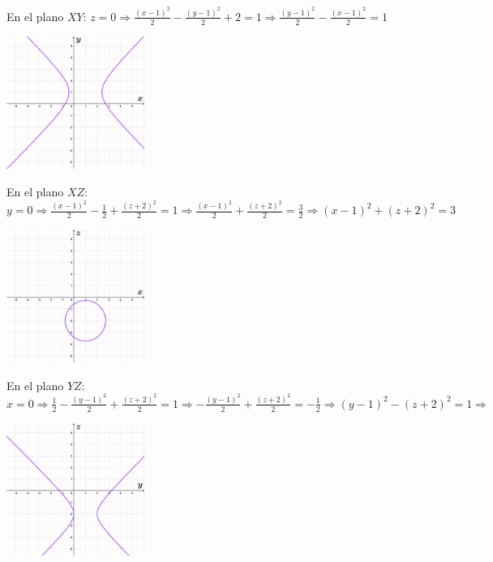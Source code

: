 \documentclass{article}
\begin{document}
\begin{enumerate}
{\begin{enumerate}
{                        En el plano $XY$:
                        \(
                            z=0 \Rightarrow
                            \frac{(x-1)^2}{2}-\frac{(y-1)^2}{2}+2=1\Rightarrow
                            \frac{(y-1)^2}{2}-\frac{(x-1)^2}{2}=1
                        \)
                        \begin{center}
                            \includegraphics[width=4.5cm]{img/7b1.png}
                        \end{center}
                        En el plano $XZ$:
                        \(
                            y=0\Rightarrow
                            \frac{(x-1)^2}{2}-\frac{1}{2}+\frac{(z+2)^2}{2}=1\Rightarrow
                            \frac{(x-1)^2}{2}+\frac{(z+2)^2}{2}=\frac{3}{2}\Rightarrow
                            (x-1)^2+(z+2)^2=3
                        \)
                        \begin{center}
                            \includegraphics[width=4.5cm]{img/7b2.png}
                        \end{center}
                        En el plano $YZ$:
                        \(
                            x=0 \Rightarrow
                            \frac{1}{2}-\frac{(y-1)^2}{2}+\frac{(z+2)^2}{2}=1\Rightarrow
                            -\frac{(y-1)^2}{2}+\frac{(z+2)^2}{2}=-\frac{1}{2}\Rightarrow
                            (y-1)^2-(z+2)^2=1\Rightarrow
                        \)
                        \begin{center}
                            \includegraphics[width=4.5cm]{img/7b3.png}

\end{center}}
\end{enumerate}}
\end{enumerate}
\end{document}
